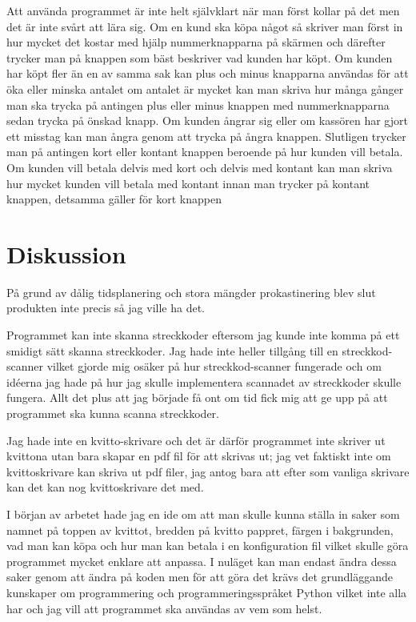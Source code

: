 \documentclass[a4paper, 12pt]{article}
\begin{document}
Att använda programmet är inte helt självklart när man först kollar på det men det är inte svårt att lära sig.
Om en kund ska köpa något så skriver man först in hur mycket det kostar med hjälp nummerknapparna på skärmen och därefter trycker man på knappen som bäst beskriver vad kunden har köpt.
Om kunden har köpt fler än en av samma sak kan plus och minus knapparna användas för att öka eller minska antalet om antalet är mycket kan man skriva hur många gånger man ska trycka på antingen plus eller minus knappen med nummerknapparna sedan trycka på önskad knapp.
 Om kunden ångrar sig eller om kassören har gjort ett misstag kan man ångra genom att trycka på ångra knappen.
 Slutligen trycker man på antingen kort eller kontant knappen beroende på hur kunden vill betala. Om kunden vill betala delvis med kort och delvis med kontant kan man skriva hur mycket kunden vill betala med kontant innan man trycker på kontant knappen, detsamma gäller för kort knappen


\section{Diskussion}

På grund av dålig tidsplanering och stora mängder prokastinering blev slut produkten inte precis så jag ville ha det.


Programmet kan inte skanna streckkoder eftersom jag kunde inte komma på ett smidigt sätt skanna streckkoder. 
Jag hade inte heller tillgång till en streckkod-scanner vilket gjorde mig osäker på hur streckkod-scanner fungerade och om idéerna jag hade på hur jag skulle implementera scannadet av streckkoder skulle fungera. Allt det plus att jag började få ont om tid fick mig att ge upp på att programmet ska kunna scanna streckkoder.


Jag hade inte en kvitto-skrivare och det är därför programmet inte skriver ut kvittona utan bara skapar en pdf fil för att skrivas ut; jag vet faktiskt inte om kvittoskrivare kan skriva ut pdf filer, jag antog bara att efter som vanliga skrivare kan det kan nog kvittoskrivare det med.


I början av arbetet hade jag en ide om att man skulle kunna ställa in saker som namnet på toppen av kvittot, bredden på kvitto pappret, färgen i bakgrunden, vad man kan köpa och hur man kan betala i en konfiguration fil vilket skulle göra programmet mycket enklare att anpassa. I nuläget kan man endast ändra dessa saker genom att ändra på koden men för att göra det krävs det grundläggande kunskaper om programmering och programmeringsspråket Python vilket inte alla har och jag vill att programmet ska användas av vem som helst.
\end{document}
